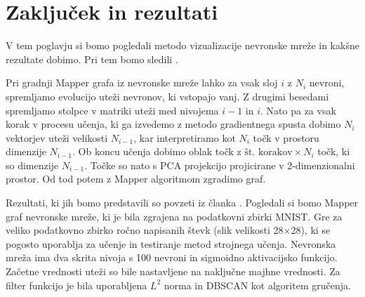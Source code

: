 \chapter{Zaključek in rezultati}
V tem poglavju si bomo pogledali metodo vizualizacije nevronske mreže in kakšne rezultate dobimo. Pri tem bomo sledili \cite{Gabella_2021}.

Pri gradnji Mapper grafa iz nevronske mreže lahko za vsak sloj \(i\) z \(N_i\) nevroni, spremljamo evolucijo uteži nevronov, ki vstopajo vanj. Z drugimi besedami spremljamo stolpce v matriki uteži med nivojema \(i-1\) in \(i\). Nato pa za vsak korak v procesu učenja, ki ga izvedemo z metodo gradientnega spusta dobimo \(N_i\) vektorjev uteži velikosti \(N_{i-1}\), kar interpretiramo kot \(N_i\) točk v prostoru dimenzije \(N_{i-1}\). Ob koncu učenja dobimo oblak točk z \(\text{št. korakov} \times N_i\) točk, ki so dimenzije \(N_{i-1}\). Točke so nato s PCA projekcijo projicirane v 2-dimenzionalni prostor. Od tod potem z Mapper algoritmom zgradimo graf.

Rezultati, ki jih bomo predstavili so povzeti iz članka \cite{Gabella_2021}. Pogledali si bomo Mapper graf nevronske mreže, ki je bila zgrajena na podatkovni zbirki MNIST. Gre za veliko podatkovno zbirko ročno napisanih števk (slik velikosti 28$\times$28), ki se pogosto uporablja za učenje in testiranje metod strojnega učenja.
Nevronska mreža ima dva skrita nivoja s 100 nevroni in sigmoidno aktivacijsko funkcijo. Začetne vrednosti uteži so bile nastavljene na naključne majhne vrednosti. Za filter funkcijo je bila uporabljena $L^2$ norma in DBSCAN kot algoritem gručenja.

